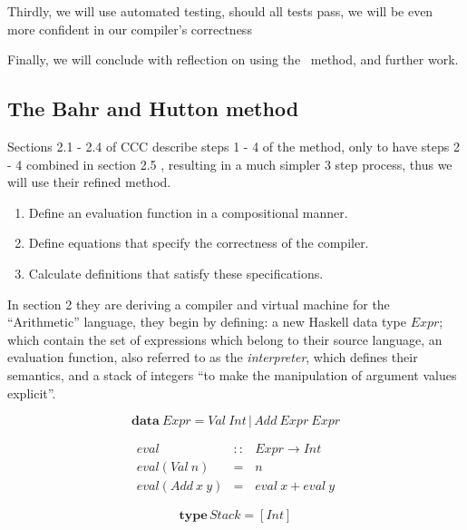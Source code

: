 \documentclass {article}
\begin{document}
Thirdly, we will use automated testing,
should all tests pass, we will
be even more confident in our 
compiler's correctness

Finally, we will conclude with 
reflection on using the \BH\ method,
and further work.




\subsection{The Bahr and Hutton method}

Sections 2.1 - 2.4 of CCC describe steps
1 - 4 of the method, only to have steps 2 - 4 combined
in section 2.5 \cite[2.5 Combining the transformation steps]{bandh},
resulting in a much simpler 3 step process, 
thus we will use their refined method\cite[page 12]{bandh}.

\begin{enumerate}
	\item Define an evaluation function
		in a compositional manner.
	\item Define equations that specify
		the correctness of the compiler.
	\item Calculate definitions that 
		satisfy these specifications.
\end{enumerate}

In section 2 they are deriving a compiler
and virtual machine for the ``Arithmetic'' language,
they begin by defining: a new Haskell data type $Expr$;
which contain the set of expressions which belong to their source language,
an evaluation function, also referred to as the \emph{interpreter},
which defines their semantics,
and a stack of integers 
``to make the manipulation of argument values explicit''.

	\[ \textbf{data}\  Expr = Val\ Int \, | \, Add\ Expr\ Expr\]

\newcommand{\eval}{$eval$}
\newcommand{\expr}{$Expr$}
\newcommand{\val}{$Val$}
\newcommand{\add}{$Add$}
\newcommand{\code}{$Code$}

\begin{eqnarray*}
	 eval &::& Expr \rightarrow Int \\ 
	 eval (Val\  n) &=& n \\
	 eval (Add\  x\  y) &=& eval\  x + eval\  y 
\end{eqnarray*}

	\[ \textbf{type} \, Stack = [Int]\]
\end{document}
